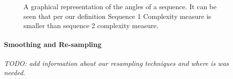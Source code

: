 \documentclass[journal,compsoc]{IEEEtran}
\begin{document}
\begin{figure}[h]
     \begin{center}
    \end{center}
    \caption{A graphical representation of the angles of a sequence. It can be seen that per our definition Sequence 1 Complexity measure is smaller than sequence 2 complexity measure.}
   \label{fig:sequence_complexity}
\end{figure}

\paragraph{Smoothing and Re-sampling}
\emph{TODO: add information about our resampling techniques and where is was needed.}
\end{document}
